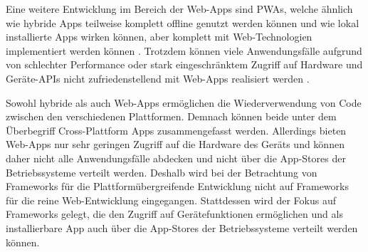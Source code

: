 Eine weitere Entwicklung im Bereich der Web-Apps sind \acp{PWA}, welche ähnlich wie hybride Apps teilweise komplett offline genutzt werden können und wie lokal installierte Apps wirken können, aber komplett mit Web-Technologien implementiert werden können \cite{PWA}.
Trotzdem können viele Anwendungsfälle aufgrund von schlechter Performance oder stark eingeschränktem Zugriff auf Hardware und Geräte-\acp{API} nicht zufriedenstellend mit Web-Apps realisiert werden \cite{Pinto_Native_to_Cross_Platform}.


Sowohl hybride als auch Web-Apps ermöglichen die Wiederverwendung von Code zwischen den verschiedenen Plattformen.
Demnach können beide unter dem Überbegriff Cross-Plattform Apps zusammengefasst werden.
Allerdings bieten Web-Apps nur sehr geringen Zugriff auf die Hardware des Geräts und können daher nicht alle Anwendungsfälle abdecken und nicht über die App-Stores der Betriebssysteme verteilt werden.
Deshalb wird bei der Betrachtung von Frameworks für die Plattformübergreifende Entwicklung nicht auf Frameworks für die reine Web-Entwicklung eingegangen.
Stattdessen wird der Fokus auf Frameworks gelegt, die den Zugriff auf Gerätefunktionen ermöglichen und als installierbare App auch über die App-Stores der Betriebssysteme verteilt werden können.

